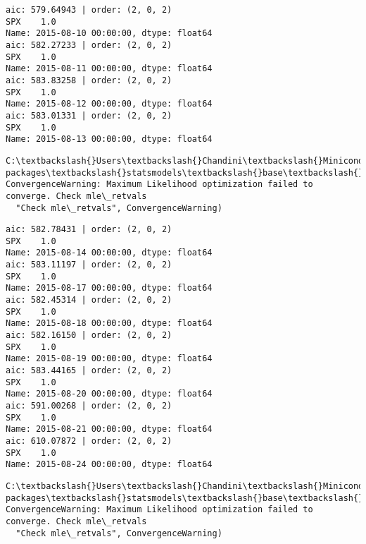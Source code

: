 \documentclass[11pt]{article}
\begin{document}
    \begin{Verbatim}[commandchars=\\\{\}]
aic: 579.64943 | order: (2, 0, 2)
SPX    1.0
Name: 2015-08-10 00:00:00, dtype: float64
aic: 582.27233 | order: (2, 0, 2)
SPX    1.0
Name: 2015-08-11 00:00:00, dtype: float64
aic: 583.83258 | order: (2, 0, 2)
SPX    1.0
Name: 2015-08-12 00:00:00, dtype: float64
aic: 583.01331 | order: (2, 0, 2)
SPX    1.0
Name: 2015-08-13 00:00:00, dtype: float64

    \end{Verbatim}

    \begin{Verbatim}[commandchars=\\\{\}]
C:\textbackslash{}Users\textbackslash{}Chandini\textbackslash{}Miniconda3\textbackslash{}envs\textbackslash{}auquan\textbackslash{}lib\textbackslash{}site-packages\textbackslash{}statsmodels\textbackslash{}base\textbackslash{}model.py:496: ConvergenceWarning: Maximum Likelihood optimization failed to converge. Check mle\_retvals
  "Check mle\_retvals", ConvergenceWarning)

    \end{Verbatim}

    \begin{Verbatim}[commandchars=\\\{\}]
aic: 582.78431 | order: (2, 0, 2)
SPX    1.0
Name: 2015-08-14 00:00:00, dtype: float64
aic: 583.11197 | order: (2, 0, 2)
SPX    1.0
Name: 2015-08-17 00:00:00, dtype: float64
aic: 582.45314 | order: (2, 0, 2)
SPX    1.0
Name: 2015-08-18 00:00:00, dtype: float64
aic: 582.16150 | order: (2, 0, 2)
SPX    1.0
Name: 2015-08-19 00:00:00, dtype: float64
aic: 583.44165 | order: (2, 0, 2)
SPX    1.0
Name: 2015-08-20 00:00:00, dtype: float64
aic: 591.00268 | order: (2, 0, 2)
SPX    1.0
Name: 2015-08-21 00:00:00, dtype: float64
aic: 610.07872 | order: (2, 0, 2)
SPX    1.0
Name: 2015-08-24 00:00:00, dtype: float64

    \end{Verbatim}

    \begin{Verbatim}[commandchars=\\\{\}]
C:\textbackslash{}Users\textbackslash{}Chandini\textbackslash{}Miniconda3\textbackslash{}envs\textbackslash{}auquan\textbackslash{}lib\textbackslash{}site-packages\textbackslash{}statsmodels\textbackslash{}base\textbackslash{}model.py:496: ConvergenceWarning: Maximum Likelihood optimization failed to converge. Check mle\_retvals
  "Check mle\_retvals", ConvergenceWarning)

    \end{Verbatim}
\end{document}
